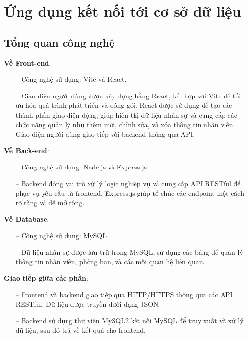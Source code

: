 \section{Ứng dụng kết nối tới cơ sở dữ liệu}
\subsection{Tổng quan công nghệ}
\textbf{Về Front-end}:
\begin{itemize}
    \item [--] Công nghệ sử dụng: Vite và React.
    \item [--] Giao diện người dùng được xây dựng bằng React, kết hợp với Vite để tối ưu hóa quá trình phát triển và đóng gói. React được sử dụng để tạo các thành phần giao diện động, giúp hiển thị dữ liệu nhân sự và cung cấp các chức năng quản lý như thêm mới, chỉnh sửa, và xóa thông tin nhân viên. Giao diện người dùng giao tiếp với backend thông qua API.
\end{itemize}

\textbf{Về Back-end}:
\begin{itemize}
    \item [--] Công nghệ sử dụng: Node.js và Express.js.
    \item [--] Backend đóng vai trò xử lý logic nghiệp vụ và cung cấp API RESTful để phục vụ yêu cầu từ frontend. Express.js giúp tổ chức các endpoint một cách rõ ràng và dễ mở rộng. 
\end{itemize}

\textbf{Về Database}:
\begin{itemize}
    \item [--] Công nghệ sử dụng: MySQL
    \item [--] Dữ liệu nhân sự được lưu trữ trong MySQL, sử dụng các bảng để quản lý thông tin nhân viên, phòng ban, và các mối quan hệ liên quan.
\end{itemize}

\textbf{Giao tiếp giữa các phần}:
\begin{itemize}
    \item [--] Frontend và backend giao tiếp qua HTTP/HTTPS thông qua các API RESTful. Dữ liệu được truyền dưới dạng JSON.
    \item [--] Backend sử dụng thư viện MySQL2 kết nối MySQL để truy xuất và xử lý dữ liệu, sau đó trả về kết quả cho frontend.
\end{itemize}

\newpage
